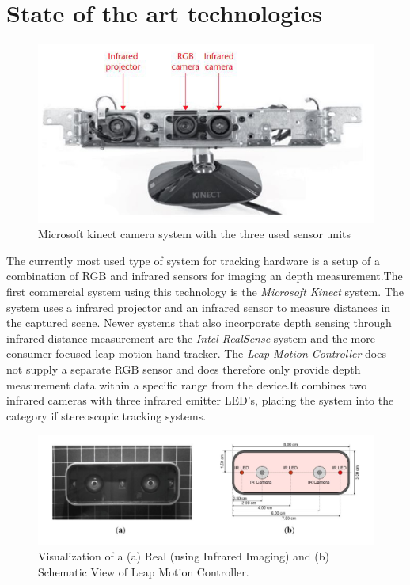 \section{State of the art technologies}
\begin{figure}
\label{img:kinect}
\includegraphics[width=\textwidth/2]{images/kinnect.JPG} 
\caption{Microsoft kinect camera system with the three used sensor units\cite{Zhang.2012}}
\end{figure}
The currently most used type of system for tracking hardware is a setup of a combination of RGB and infrared sensors for imaging an depth measurement.The first commercial system using this technology is the\textit{ Microsoft Kinect} system. The system uses a infrared projector and an infrared sensor to measure distances in the captured scene.
Newer systems that also incorporate depth sensing through infrared distance measurement are the \textit{Intel RealSense} system and the more consumer focused leap motion hand tracker. The\textit{ Leap Motion Controller} does not supply a separate RGB sensor and does therefore only provide depth measurement data within a specific range from the device\cite{Weichert.2013}.It combines two infrared cameras with three infrared emitter LED's, placing the system into the category if stereoscopic tracking systems.
\begin{figure}[H]
\includegraphics[width=\textwidth]{images/leapMotion.JPG}
\caption{Visualization of a (a) Real (using Infrared Imaging) and (b) Schematic View of Leap Motion Controller\cite{Weichert.2013}.}
\label{img:leapMotion} 
\end{figure}
